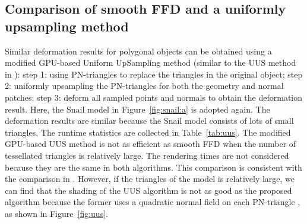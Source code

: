 \documentclass[3p]{elsarticle}
\begin{document}
\subsection{Comparison of smooth FFD and a uniformly upsampling method}

Similar deformation results for polygonal objects can be obtained using a modified GPU-based Uniform UpSampling method
(similar to the UUS method in \cite{Cui13}): step 1: using PN-triangles to replace the triangles in the original object;
step 2: uniformly upsampling the PN-triangles for both the geometry and normal patches; step 3: deform all sampled
points and normals to obtain the deformation result. Here, the Snail model in Figure~\ref{fig:snail:a} is adopted
again. The deformation results are similar because the Snail model consists of lots of small triangles. The runtime
statistics are collected in Table~\ref{tab:uus}. The modified GPU-based UUS method is not as efficient as smooth FFD
when the number of tessellated triangles is relatively large. The rendering times are not considered because they are
the same in both algorithms. This comparison is consistent with the comparison in \cite{Cui13}. However, if the
triangles of the model is relatively large, we can find that the shading of the UUS algorithm is not as good as the
proposed algorithm because the former uses a quadratic normal field on each PN-triangle \cite{Vlachos01}, as shown in
Figure~\ref{fig:uus}.
\end{document}
